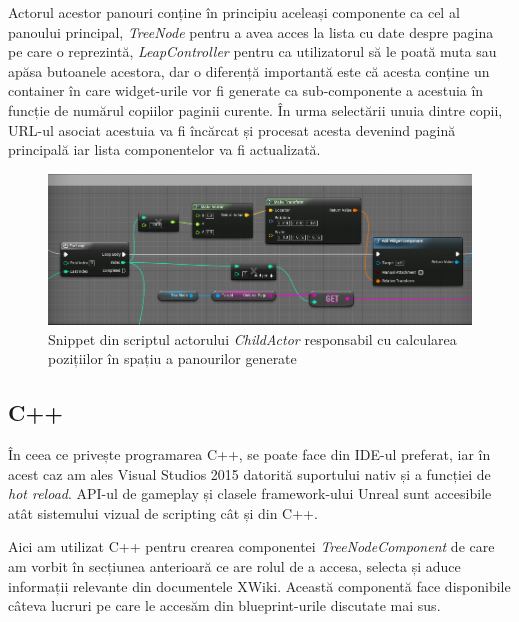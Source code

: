 Actorul acestor panouri conține în principiu aceleași componente ca cel al panoului principal, \textit{TreeNode} pentru a avea acces la lista cu date despre pagina pe care o reprezintă, \textit{LeapController} pentru ca utilizatorul să le poată muta sau apăsa butoanele acestora, dar o diferență importantă este că acesta conține un container în care widget-urile vor fi generate ca sub-componente a acestuia în funcție de numărul copiilor paginii curente.
În urma selectării unuia dintre copii, URL-ul asociat acestuia va fi încărcat și procesat acesta devenind pagină principală iar lista componentelor va fi actualizată.


\begin{figure}[h]
  \centering
  \includegraphics[scale=0.55]{img/SnipetTransform.png}
  \caption{Snippet din scriptul actorului \textit{ChildActor} responsabil cu calcularea pozițiilor în spațiu a panourilor generate}
\end{figure}

\subsection{C++}

În ceea ce privește programarea C++, se poate face din IDE-ul preferat, iar în acest caz am ales Visual Studios 2015 datorită suportului nativ și a funcției de \textit{hot reload}.
API-ul de gameplay și clasele framework-ului Unreal sunt accesibile atât sistemului vizual de scripting cât și din C++.

Aici am utilizat C++ pentru crearea componentei \textit{TreeNodeComponent} de care am vorbit în secțiunea anterioară ce are rolul de a accesa, selecta și aduce informații relevante din documentele XWiki.
Această componentă face disponibile câteva lucruri pe care le accesăm din blueprint-urile discutate mai sus.


